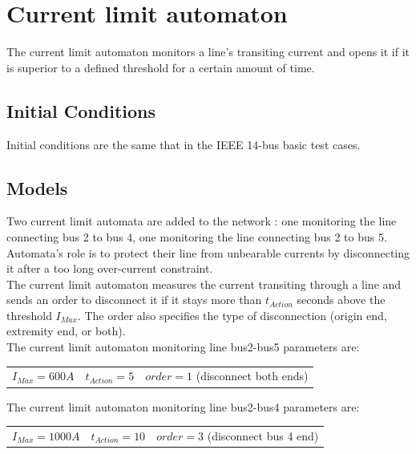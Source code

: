 \documentclass[a4paper, 12pt]{report}
\begin{document}
\newpage
\section{Current limit automaton}
\label{CurrentLimitAutomaton}

The current limit automaton monitors a line's transiting current and opens it if it is superior to a defined threshold for a certain amount of time.

\subsection{Initial Conditions}

Initial conditions are the same that in the IEEE 14-bus basic test cases.

\subsection{Models}

Two current limit automata are added to the network : one monitoring the line connecting bus 2 to bus 4, one monitoring the line connecting bus 2 to bus 5.
Automata's role is to protect their line from unbearable currents by disconnecting it after a too long over-current constraint. \\

The current limit automaton measures the current transiting through a line and sends an order to disconnect it if it stays more than $t_{Action}$ seconds above the threshold $I_{Max}$. The order also specifies the type of disconnection (origin end, extremity end, or both).\\

The current limit automaton monitoring line bus2-bus5 parameters are:
\begin{center}
\begin{tabular}{l|l|l}
   $I_{Max}=600A$ & $t_{Action}=5$ & $order=1$ (disconnect both ends)\\
\end{tabular}
\end{center}

The current limit automaton monitoring line bus2-bus4 parameters are:
\begin{center}
\begin{tabular}{l|l|l}
   $I_{Max}=1000A$ & $t_{Action}=10$ & $order=3$ (disconnect bus 4 end)\\
\end{tabular}
\end{center}
\end{document}
